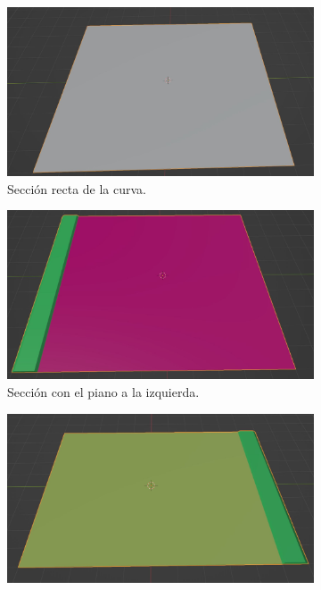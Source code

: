 \begin{figure}[H]
    \centering
    \begin{subfigure}[t]{0.48\textwidth}
        \centering
        \includegraphics[width=\textwidth]{imagenes/converted/pista/curva-recta.jpg}
        \caption{Sección recta de la curva.}
        \label{fig:curvarecta}
    \end{subfigure}
    \hfill
    \begin{subfigure}[t]{0.48\textwidth}
        \centering
        \includegraphics[width=\textwidth]{imagenes/converted/pista/curva.jpg}
        \caption{Sección con el piano a la izquierda.}
        \label{fig:curvaL}
    \end{subfigure}
    \par\bigskip
    \begin{subfigure}[t]{0.48\textwidth}
        \centering
        \includegraphics[width=\textwidth]{imagenes/converted/pista/curva-inverted.jpg}

\end{subfigure}
\end{figure}
